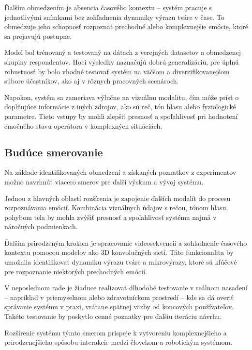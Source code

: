 Ďalším obmedzením je absencia časového kontextu – systém pracuje s jednotlivými snímkami bez zohľadnenia dynamiky výrazu tváre v čase. To obmedzuje jeho schopnosť rozpoznať prechodné alebo komplexnejšie emócie, ktoré sa prejavujú postupne.

Model bol trénovaný a testovaný na dátach z verejných datasetov a obmedzenej skupiny respondentov. Hoci výsledky naznačujú dobrú generalizáciu, pre úplnú robustnosť by bolo vhodné testovať systém na väčšom a diverzifikovanejšom súbore účastníkov, ako aj v rôznych pracovných scenároch.

Napokon, systém sa zameriava výlučne na vizuálnu modalitu, čím môže prísť o doplňujúce informácie z iných zdrojov, ako sú reč, tón hlasu alebo fyziologické parametre. Tieto vstupy by mohli zlepšiť presnosť a spoľahlivosť pri hodnotení emočného stavu operátora v komplexných situáciách.

\subsection{Budúce smerovanie}

Na základe identifikovaných obmedzení a získaných poznatkov z experimentov možno navrhnúť viacero smerov pre ďalší výskum a vývoj systému.

Jednou z hlavných oblastí rozšírenia je zapojenie ďalších modalít do procesu rozpoznávania emócií. Kombinácia vizuálnych údajov s rečou, tónom hlasu, pohybom tela by mohla zvýšiť presnosť a spoľahlivosť systému najmä v náročných podmienkach.

Ďalším prirodzeným krokom je spracovanie videosekvencií a zohľadnenie časového kontextu pomocou modelov ako 3D konvolučných sietí. Táto funkcionalita by umožnila identifikovať dynamiku výrazu tváre a mikrovýrazy, ktoré sú kľúčové pre rozpoznanie niektorých prechodných emócií.

V neposlednom rade je žiaduce realizovať dlhodobé testovanie v reálnom nasadení – napríklad v priemyselnom alebo zdravotníckom prostredí – kde sa dá overiť správanie systému v praxi, vrátane spätnej väzby od koncových používateľov. Takéto testovanie by poskytlo cenné poznatky pre ďalšiu iteráciu návrhu.

Rozšírenie systému týmto smerom prispeje k vytvoreniu komplexnejšieho a prirodzenejšieho spôsobu interakcie medzi človekom a robotickým systémom.
